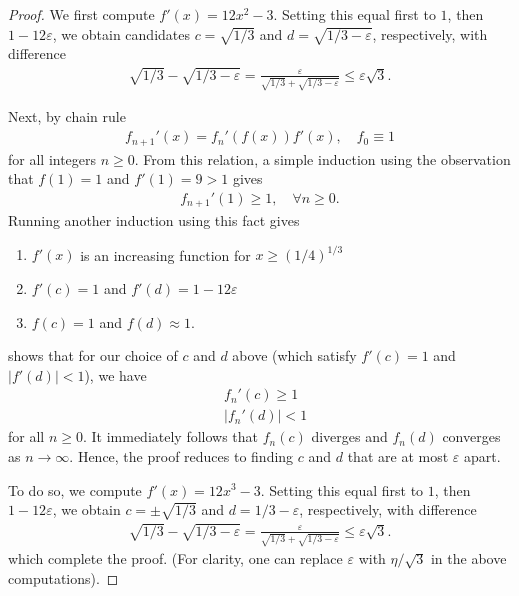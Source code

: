 \documentclass[12pt,reqno]{amsart}
\numberwithin{equation}{section}  %
\newcommand{\ee}{\varepsilon}
\begin{document}
\begin{proof}
We first compute $f'(x) = 12x^2 - 3$. Setting this equal first
to $1$, then $1- 12\ee$, we obtain candidates $c = \sqrt{1/3}$ and $d =
\sqrt{1/3 - \ee}$, respectively, with difference
\begin{align*}
\sqrt{1/3} - \sqrt{1/3 - \ee} = \frac{\ee}{\sqrt{1/3} + \sqrt{1/3 - \ee}} \le
\ee \sqrt{3}.
\end{align*}

Next, by chain rule
\begin{align*}
f_{n+1}'(x) = f_n'(f(x)) f'(x), \quad f_0 \equiv 1
\end{align*}
for all integers $n \ge 0$.
From this relation, a simple induction
using the observation that $f(1) = 1$ and $f'(1) = 9 > 1$
gives
\begin{align*}
f_{n+1}'(1) \ge 1, \quad \forall n\ge0.
\end{align*}
Running another induction using this fact gives
\begin{enumerate}
\item
$f'(x)$ is an increasing function for $x \ge (1/4)^{1/3}$
\item
$f'(c)=1$ and $f'(d) = 1 - 12 \ee$
\item
$f(c) = 1$ and $f(d) \approx 1$.
\end{enumerate}
shows that for our choice of $c$ and $d$ above
(which satisfy $f'(c) = 1$ and $|f'(d)| < 1$), we have
\begin{align*}
& f_{n}'(c) \ge 1 \\
& | f_{n}'(d) |  < 1
\end{align*}
for all $n \ge 0$.
It immediately follows that $f_n(c)$ diverges and $f_n(d)$ converges
as $n \to \infty$. Hence, the proof reduces to finding $c$ and $d$
that are at most $\ee$ apart.


To do so, we compute $f'(x) = 12x^3 - 3$. Setting this equal first
to $1$, then $1- 12\ee$, we obtain $c = \pm \sqrt{1/3}$ and $d = 1/3 - \ee$,
respectively, with difference
\begin{align*}
\sqrt{1/3} - \sqrt{1/3 - \ee} = \frac{\ee}{\sqrt{1/3} + \sqrt{1/3 - \ee}} \le
\ee \sqrt{3}.
\end{align*}
which complete the proof. (For clarity, one can replace $\ee$ with
$\eta/\sqrt{3}$ in the above computations).


\end{proof}
\end{document}
